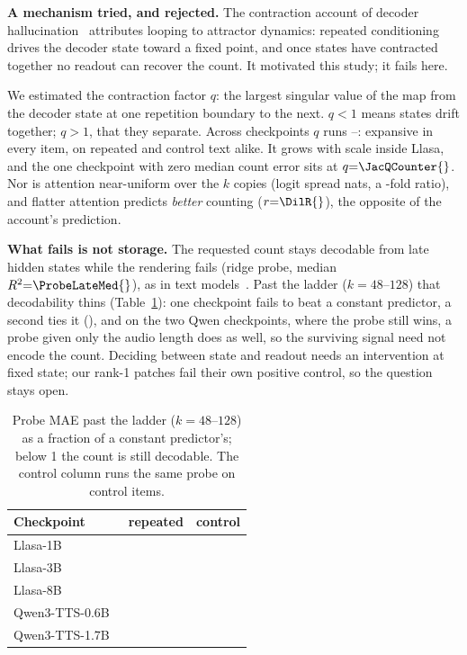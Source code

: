 \documentclass{article}
\newcommand{\tabsize}{\small}
\begin{document}
\textbf{A mechanism tried, and rejected.}
The contraction account of decoder
hallucination~\cite{viakhirev2026dispersion} attributes looping to
attractor dynamics: repeated conditioning drives the decoder state toward a
fixed point, and once states have contracted together no readout can
recover the count. It motivated this study; it fails here.

We estimated the contraction factor $q$: the largest singular value of
the map from the decoder state at one repetition boundary to the next.
$q<1$ means states drift together; $q>1$, that they separate. Across \JacPanelN{} checkpoints $q$ runs \JacQMin{}--\JacQMax{}:
expansive in every item, on repeated and control text alike. It grows with
scale inside Llasa, and the one checkpoint with zero median count error
sits at $q{=}\JacQCounter{}$. Nor is attention near-uniform over the $k$ copies (logit spread
\DeltaMax{} nats, a \DeltaRatio{}-fold ratio), and flatter attention
predicts \emph{better} counting ($r{=}\DilR{}$), the opposite of the
account's prediction.

\textbf{What fails is not storage.}
The requested count stays decodable from late hidden states while the
rendering fails (ridge probe, median $R^2{=}\ProbeLateMed{}$), as in text
models~\cite{venkatesh2026repeated}. Past the ladder ($k{=}48$--$128$) that decodability thins
(Table~\ref{tab:probe}): one checkpoint fails to beat a constant
predictor, a second ties it (\PhRepLlasaThreeB{}), and on the two Qwen
checkpoints, where the probe still wins, a probe given only the audio
length does as well, so the surviving signal need not encode the count. Deciding between state and readout needs an intervention at
fixed state; our rank-1 patches fail their own positive control, so the
question stays open.

\begin{table}[t]
\centering
\caption{Probe MAE past the ladder ($k{=}48$--$128$) as a fraction of a
constant predictor's; below 1 the count is still decodable. The control
column runs the same probe on control items.}
\label{tab:probe}
{\tabsize\setlength{\tabcolsep}{6pt}
\begin{tabular}{lrr}
\toprule
Checkpoint & repeated & control \\
\midrule
Llasa-1B~\cite{ye2025llasa} & \PhRepLlasaOneB{} & \PhCtlLlasaOneB{} \\
Llasa-3B~\cite{ye2025llasa} & \PhRepLlasaThreeB{} & \PhCtlLlasaThreeB{} \\
Llasa-8B~\cite{ye2025llasa} & \PhRepLlasaEightB{} & \PhCtlLlasaEightB{} \\
Qwen3-TTS-0.6B~\cite{hu2026qwen3tts} & \PhRepQwenZeroSixB{} & \PhCtlQwenZeroSixB{} \\
Qwen3-TTS-1.7B~\cite{hu2026qwen3tts} & \PhRepQwenOneSevenB{} & \PhCtlQwenOneSevenB{} \\
\bottomrule
\end{tabular}}
\end{table}
\end{document}
